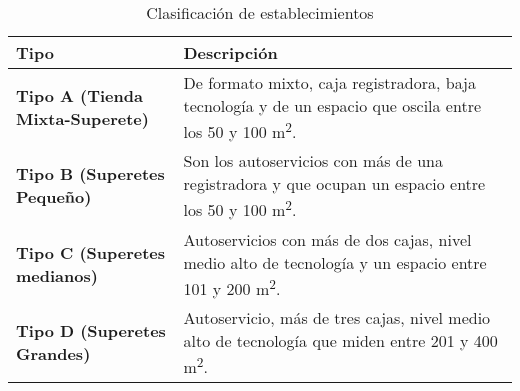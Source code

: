 \newpage

\begin{table}[h]
\centering
\caption{Clasificación de establecimientos}
\begin{tabular}{>{\bfseries}l p{8cm}}
\toprule
\textbf{Tipo} & \textbf{Descripción} \\
\midrule
Tipo A (Tienda Mixta-Superete) & De formato mixto, caja registradora, baja tecnología y de un espacio que oscila entre los 50 y 100 m\textsuperscript{2}. \\
\addlinespace
Tipo B (Superetes Pequeño) & Son los autoservicios con más de una registradora y que ocupan un espacio entre los 50 y 100 m\textsuperscript{2}. \\
\addlinespace
Tipo C (Superetes medianos) & Autoservicios con más de dos cajas, nivel medio alto de tecnología y un espacio entre 101 y 200 m\textsuperscript{2}. \\
\addlinespace
Tipo D (Superetes Grandes) & Autoservicio, más de tres cajas, nivel medio alto de tecnología que miden entre 201 y 400 m\textsuperscript{2}. \\
\bottomrule
\end{tabular}
\end{table}
